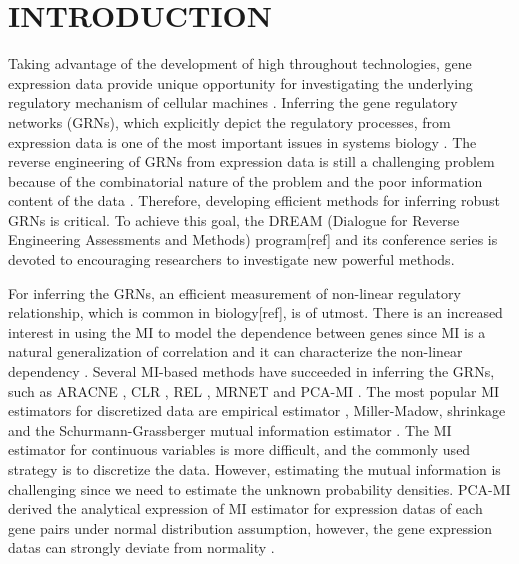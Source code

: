 \documentclass{bioinfo}
\begin{document}
\section{INTRODUCTION}

Taking advantage of the development of high throughout technologies,
gene expression data provide unique opportunity for investigating
the underlying regulatory mechanism of cellular machines
\citep{hughes2000functional}. Inferring the gene regulatory networks
(GRNs), which explicitly depict the regulatory processes, from
expression data is one of the most important issues in systems
biology \citep{basso2005reverse}. The reverse engineering of GRNs
from expression data is still a challenging problem because of the
combinatorial nature of the problem and the poor information content
of the data \citep{margolin2006reverse}. Therefore, developing
efficient methods for inferring robust GRNs is critical. To achieve
this goal, the DREAM (Dialogue for Reverse Engineering Assessments
and Methods) program[ref] and its conference series is devoted to
encouraging researchers to investigate new powerful methods.

For inferring the GRNs, an efficient measurement of non-linear
regulatory relationship, which is common in biology[ref], is of
utmost. There is an increased interest in using the MI to  model the
dependence between genes since MI is a natural generalization of
correlation and it can characterize the non-linear dependency
\citep{brunel2010miss,cover2006elements}.  Several MI-based methods
have succeeded in inferring the GRNs, such as ARACNE
\citep{margolin2006aracne}, CLR \citep{faith2007large}, REL
\citep{butte2000mutual} , MRNET \citep{meyer2008minet}  and PCA-MI
\citep{zhang2012inferring}. The most popular MI estimators for
discretized data are empirical estimator
\citep{paninski2003estimation},
Miller-Madow\citep{paninski2003estimation}, shrinkage
\citep{schafer2005shrinkage} and the Schurmann-Grassberger mutual
information estimator  \citep{schurmann2002entropy}. The MI
estimator for continuous variables is more difficult, and the
commonly used strategy is to discretize the
data\citep{de2012bagging}. However, estimating the mutual
information is challenging since we need to estimate the unknown
probability densities. PCA-MI \citep{zhang2012inferring} derived the
analytical expression of MI estimator for expression datas of each
gene pairs under normal distribution assumption, however,  the gene
expression datas can strongly deviate from normality
\citep{emmert2010local}.
\end{document}
